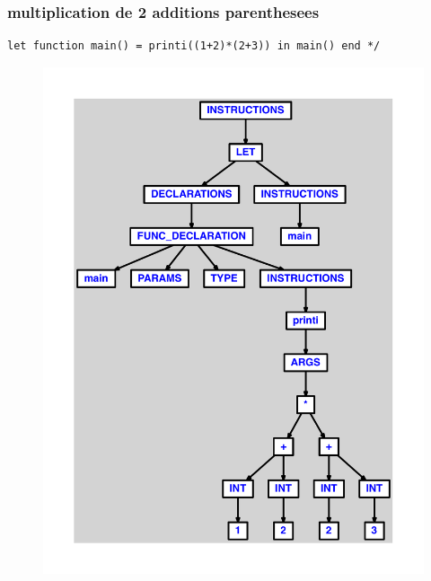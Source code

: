 \documentclass{article}
\begin{document}
\subsubsection{multiplication de 2 additions parenthesees}
\begin{lstlisting}
let function main() = printi((1+2)*(2+3)) in main() end */
\end{lstlisting}
\newpage
\begin{figure}[H]
\centering
\includegraphics[max width=\textwidth]{ast/ast_103.pdf}
\end{figure}
\newpage
\end{document}
